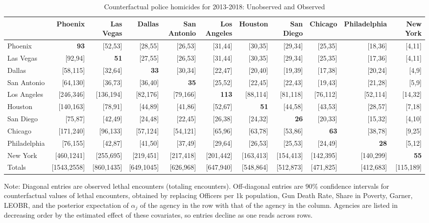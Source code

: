 \begin{table}[h!]\centering\scriptsize\tabcolsep=0.1cm\caption{Counterfactual police homicides for 2013-2018: Unobserved and Observed} \label{table:counterfactual_unobs_obs}\begin{tabular}{lrrrrrrrrrr}\hline \hline&Phoenix&Las Vegas&Dallas&San Antonio&Los Angeles&Houston&San Diego&Chicago&Philadelphia&New York\\
\hline
Phoenix&\textbf{93}&[52,53]&[28,55]&[26,53]&[31,44]&[30,35]&[29,34]&[25,35]&[18,36]&[4,11]\\
Las Vegas&[92,94]&\textbf{51}&[27,55]&[26,53]&[31,44]&[30,35]&[29,34]&[25,35]&[17,36]&[4,11]\\
Dallas&[58,115]&[32,64]&\textbf{33}&[30,34]&[22,47]&[20,40]&[19,39]&[17,38]&[20,24]&[4,9]\\
San Antonio&[64,130]&[36,73]&[36,40]&\textbf{35}&[25,52]&[22,45]&[22,43]&[19,43]&[21,28]&[5,9]\\
Los Angeles&[246,346]&[136,194]&[82,176]&[79,166]&\textbf{113}&[88,114]&[81,118]&[76,112]&[52,114]&[14,32]\\
Houston&[140,163]&[78,91]&[44,89]&[41,86]&[52,67]&\textbf{51}&[44,58]&[43,53]&[28,57]&[7,18]\\
San Diego&[75,87]&[42,49]&[24,48]&[22,45]&[26,38]&[24,32]&\textbf{26}&[20,33]&[15,32]&[4,10]\\
Chicago&[171,240]&[96,133]&[57,124]&[54,121]&[65,96]&[63,78]&[53,86]&\textbf{63}&[38,78]&[9,25]\\
Philadelphia&[76,155]&[42,87]&[41,50]&[37,49]&[29,64]&[26,53]&[25,53]&[24,49]&\textbf{28}&[5,12]\\
New York&[460,1241]&[255,695]&[219,451]&[217,418]&[201,442]&[163,413]&[154,413]&[142,395]&[140,299]&\textbf{55}\\
\hline
Totals&[1543,2558]&[860,1435]&[649,1045]&[626,968]&[647,940]&[548,864]&[512,873]&[471,825]&[412,683]&[115,189]\\
\hline 
 \end{tabular} 
 \begin{center} 
 \begin{minipage}{1.05\textwidth} %
 {\footnotesize Note: Diagonal entries are observed lethal encounters (totaling \totalincidentsten{} encounters). Off-diagonal entries are 90\% confidence intervals for counterfactual values of lethal encounters, obtained by replacing Officers per 1k population, Gun Death Rate, Share in Poverty, Garner, LEOBR, and the posterior expectation of $\alpha_j$ of the agency in the row with that of the agency in the column. Agencies are listed in decreasing order by the estimated effect of these covariates, so entries decline as one reads across rows.} 
 \end{minipage} 
 \end{center} 
 \end{table}